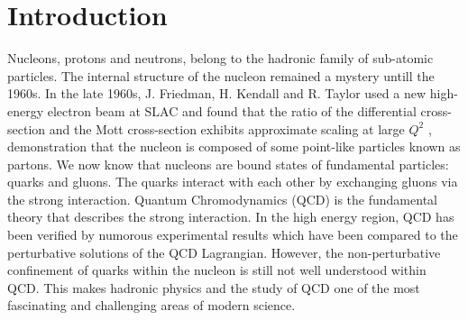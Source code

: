 

\chapter{Introduction}
\label{C1}

Nucleons, protons and neutrons, belong to the hadronic family of sub-atomic particles. The internal structure of the nucleon remained a mystery untill the 1960s. In the late 1960s, J. Friedman, H. Kendall and R. Taylor used a new high-energy electron beam at SLAC and found that the ratio of the differential cross-section and the Mott cross-section exhibits approximate scaling at large $Q^2$ \cite{Breidenbach1969}, demonstration that the nucleon is composed of some point-like particles known as partons. We now know that nucleons are bound states of fundamental particles: quarks and gluons. The quarks interact with each other by exchanging gluons via the strong interaction. Quantum Chromodynamics (QCD) is the fundamental theory that describes the strong interaction. In the high energy region, QCD has been verified by numorous experimental results which have been compared to the perturbative solutions of the QCD Lagrangian. However, the non-perturbative confinement of quarks within the nucleon is still not well understood within QCD. This makes hadronic physics and the study of QCD one of the most fascinating and challenging areas of modern science.

